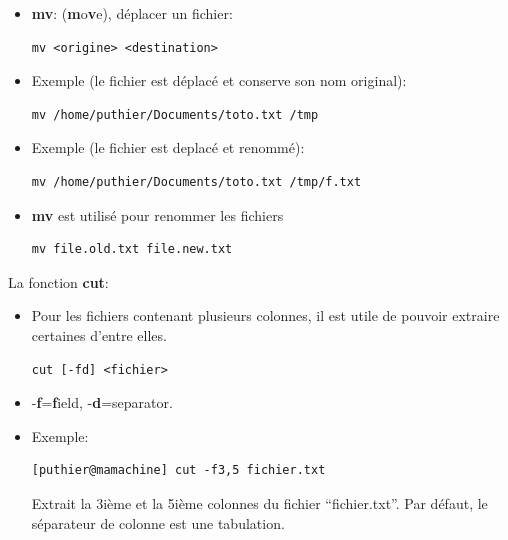 \documentclass[10pt, xcolor=dvipsnames]{beamer}
\begin{document}
\begin{frame}[fragile]

    \begin{itemize}
        \item \textbf{mv}: (\textbf{m}o\textbf{v}e), déplacer un fichier:
             \begin{verbatim}
mv <origine> <destination>
             \end{verbatim}
        \item Exemple (le fichier est déplacé et conserve son nom original):
             \begin{verbatim}
mv /home/puthier/Documents/toto.txt /tmp
             \end{verbatim}
        \item Exemple (le fichier est deplacé et renommé):
             \begin{verbatim}
mv /home/puthier/Documents/toto.txt /tmp/f.txt
             \end{verbatim}
        \item \textbf{mv} est utilisé pour renommer les fichiers
             \begin{verbatim}
mv file.old.txt file.new.txt
             \end{verbatim}
    \end{itemize}

\end{frame}


\begin{frame}[fragile]

La fonction \textbf{cut}:

    \begin{itemize}
        \item Pour les fichiers contenant plusieurs colonnes, il est utile de pouvoir
extraire certaines d'entre elles.
             \begin{verbatim}
cut [-fd] <fichier>
             \end{verbatim}
        \item -\textbf{f}=\textbf{f}ield, -\textbf{d}=separator.
        \item Exemple:
             \begin{verbatim}
[puthier@mamachine] cut -f3,5 fichier.txt
             \end{verbatim}
 Extrait la 3ième et la 5ième colonnes du fichier ``fichier.txt''. Par défaut, le séparateur de colonne est une tabulation. 
    \end{itemize}

\end{frame}
\end{document}
